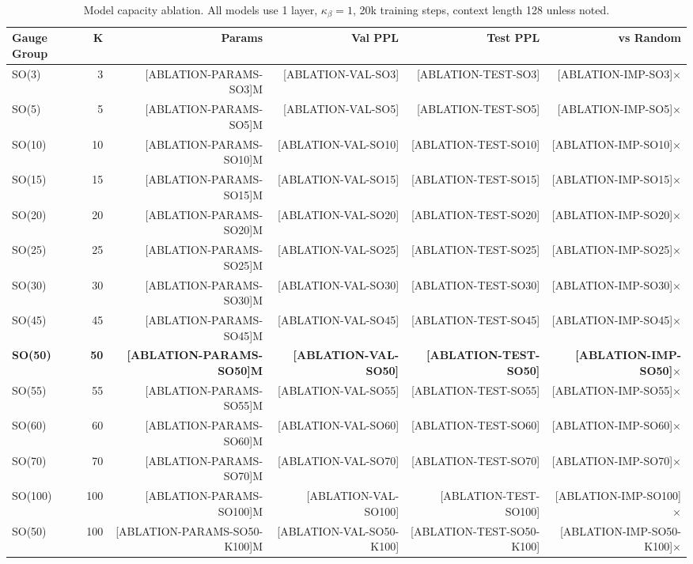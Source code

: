 \documentclass[twoside,11pt]{article}
\begin{document}
\begin{table}[h]
\centering
\small
\caption{Model capacity ablation. All models use 1 layer, $\kappa_\beta=1$, 20k training steps, context length 128 unless noted.}
\label{tab:ablation_capacity}
\begin{tabular}{lrrrrr}
\toprule
\textbf{Gauge Group} & \textbf{K} & \textbf{Params} & \textbf{Val PPL} & \textbf{Test PPL} & \textbf{vs Random} \\
\midrule
SO(3) & 3 & [ABLATION-PARAMS-SO3]M & [ABLATION-VAL-SO3] & [ABLATION-TEST-SO3] & [ABLATION-IMP-SO3]$\times$ \\
SO(5) & 5 & [ABLATION-PARAMS-SO5]M & [ABLATION-VAL-SO5] & [ABLATION-TEST-SO5] & [ABLATION-IMP-SO5]$\times$ \\
SO(10) & 10 & [ABLATION-PARAMS-SO10]M & [ABLATION-VAL-SO10] & [ABLATION-TEST-SO10] & [ABLATION-IMP-SO10]$\times$ \\
SO(15) & 15 & [ABLATION-PARAMS-SO15]M & [ABLATION-VAL-SO15] & [ABLATION-TEST-SO15] & [ABLATION-IMP-SO15]$\times$ \\
SO(20) & 20 & [ABLATION-PARAMS-SO20]M & [ABLATION-VAL-SO20] & [ABLATION-TEST-SO20] & [ABLATION-IMP-SO20]$\times$ \\
SO(25) & 25 & [ABLATION-PARAMS-SO25]M & [ABLATION-VAL-SO25] & [ABLATION-TEST-SO25] & [ABLATION-IMP-SO25]$\times$ \\
SO(30) & 30 & [ABLATION-PARAMS-SO30]M & [ABLATION-VAL-SO30] & [ABLATION-TEST-SO30] & [ABLATION-IMP-SO30]$\times$ \\
SO(45) & 45 & [ABLATION-PARAMS-SO45]M & [ABLATION-VAL-SO45] & [ABLATION-TEST-SO45] & [ABLATION-IMP-SO45]$\times$ \\
\textbf{SO(50)} & \textbf{50} & \textbf{[ABLATION-PARAMS-SO50]M} & \textbf{[ABLATION-VAL-SO50]} & \textbf{[ABLATION-TEST-SO50]} & \textbf{[ABLATION-IMP-SO50]$\times$} \\
SO(55) & 55 & [ABLATION-PARAMS-SO55]M & [ABLATION-VAL-SO55] & [ABLATION-TEST-SO55] & [ABLATION-IMP-SO55]$\times$ \\
SO(60) & 60 & [ABLATION-PARAMS-SO60]M & [ABLATION-VAL-SO60] & [ABLATION-TEST-SO60] & [ABLATION-IMP-SO60]$\times$ \\
SO(70) & 70 & [ABLATION-PARAMS-SO70]M & [ABLATION-VAL-SO70] & [ABLATION-TEST-SO70] & [ABLATION-IMP-SO70]$\times$ \\
SO(100) & 100 & [ABLATION-PARAMS-SO100]M & [ABLATION-VAL-SO100] & [ABLATION-TEST-SO100] & [ABLATION-IMP-SO100]$\times$ \\
\midrule
SO(50) & 100 & [ABLATION-PARAMS-SO50-K100]M & [ABLATION-VAL-SO50-K100] & [ABLATION-TEST-SO50-K100] & [ABLATION-IMP-SO50-K100]$\times$ \\
\bottomrule
\end{tabular}
\end{table}
\end{document}
